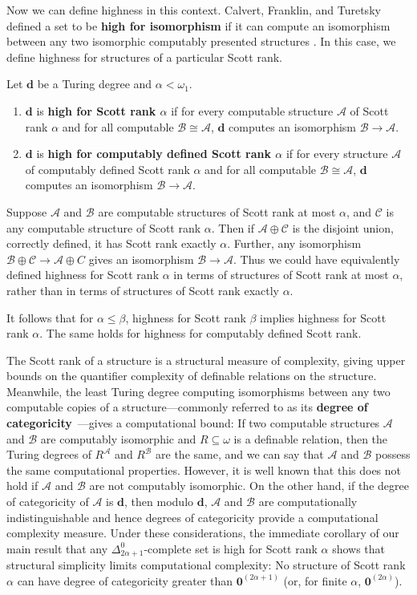 \documentclass{amsart}
\newcommand\+[1]{\mathcal{#1}}
\renewcommand\*[1]{\mathbf{#1}}
\renewcommand\=[1]{\text{#1}}
\renewcommand\*[1]{\mathbf{#1}}
\newcommand{\A}{\mathcal{A}}
\newcommand{\C}{\mathcal{C}}
\newcommand{\B}{\mathcal{B}}
\newcommand{\nat}{\omega}
\newcommand{\define}[1]{\textbf{#1}}
\begin{document}
Now we can define highness in this context. Calvert, Franklin, and Turetsky defined a set to be \define{high for isomorphism} if it can compute an isomorphism between any two isomorphic computably presented structures \cite{cft23}. In this case, we define highness for structures of a particular Scott rank.

\begin{definition} Let $\mathbf d$ be a Turing degree and $\alpha<\omega_1$.
  \begin{enumerate}
    \item $\mathbf d$ is \define{high for Scott rank $\alpha$} if for every computable structure $\A$ of Scott rank $\alpha$ and for all computable $\B\cong \A$, $\mathbf d$ computes an isomorphism $\B\to \A$.
    \item $\*d$ is \define{high for computably defined Scott rank $\alpha$} if for every structure $\A$ of computably defined Scott rank $\alpha$ and for all computable $\B\cong \A$, $\*d$ computes an isomorphism $\B\to\A$.
  \end{enumerate}
\end{definition}

Suppose $\A$ and $\B$ are computable structures of Scott rank at most $\alpha$, and $\C$ is any computable structure of Scott rank $\alpha$.  Then if $\A\oplus\C$ is the disjoint union, correctly defined, it has Scott rank exactly $\alpha$.  Further, any isomorphism $\B\oplus\C \to \A\oplus C$ gives an isomorphism $\B\to \A$.  Thus we could have equivalently defined highness for Scott rank $\alpha$ in terms of structures of Scott rank at most $\alpha$, rather than in terms of structures of Scott rank exactly $\alpha$.

It follows that for $\alpha \le \beta$, highness for Scott rank $\beta$ implies highness for Scott rank $\alpha$. The same holds for highness for computably defined Scott rank.

The Scott rank of a structure is a structural measure of complexity, giving upper bounds on the quantifier complexity of definable relations on the structure. Meanwhile, the least Turing degree computing isomorphisms between any two computable copies of a structure---commonly referred to as its \define{degree of categoricity}~\cite{fokina2010}---gives a computational bound: If two computable structures $\+A$ and $\+B$ are computably isomorphic and $R\subseteq\nat$ is a definable relation, then the Turing degrees of $R^\+A$ and $R^\+B$ are the same, and we can say that $\+A$ and $\+B$ possess the same computational properties. However, it is well known that this does not hold if $\+A$ and $\+B$ are not computably isomorphic. On the other hand, if the degree of categoricity of $\+A$ is $\*d$, then modulo $\*d$, $\+A$ and $\+B$ are computationally indistinguishable and hence degrees of categoricity provide a computational complexity measure.
Under these considerations, the immediate corollary of our main result that any $\Delta^0_{2\alpha+1}$-complete set is high for Scott rank $\alpha$ shows that structural simplicity limits computational complexity: No structure of Scott rank $\alpha$ can have degree of categoricity greater than $\mathbf 0^{(2\alpha+1)}$ (or, for finite $\alpha$, $\mathbf 0^{(2\alpha)}$).
\end{document}
